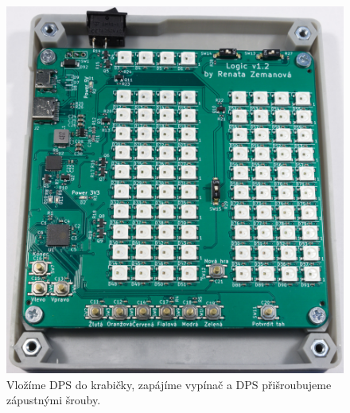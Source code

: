   \begin{figure}[!h]
    \begin{center}
      \includegraphics[scale=0.5]{prilohy/Krabicka_spodek_DPS.jpg}
    \end{center}
    \caption[Vložíme DPS do krabičky, zapájíme vypínač a DPS přišroubujeme zápustnými šrouby]{Vložíme DPS do krabičky, zapájíme vypínač a DPS přišroubujeme zápustnými šrouby.}
  \end{figure}

